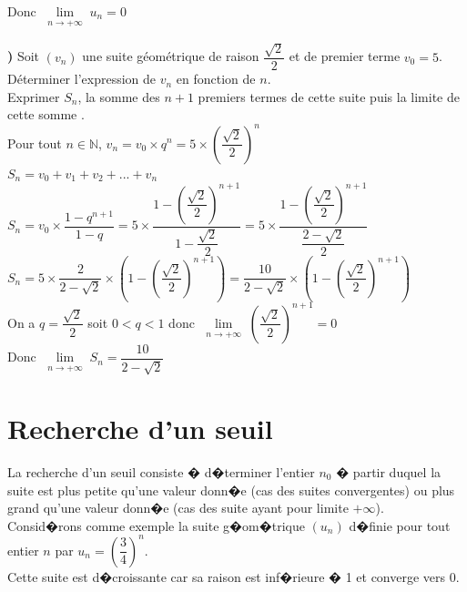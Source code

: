 \documentclass[a4paper,12pt,twoside,french]{extarticle}
\newcommand{\N}{\ensuremath{\mathbb{N}}\xspace}
\newcommand{\limite}[2]{\ensuremath{\displaystyle \lim\limits_{\substack{#1 \to #2}}}\xspace}
\newcounter{enumtabi}
\newcommand{\q}{\textbf{\stepcounter{enumtabi} \theenumtabi) } }
\begin{document}
Donc $\limite{n}{+\infty}u_n=0$\\
 
 \color{black}  
  
  \q Soit $(v_n)$ une suite géométrique de raison $\dfrac{\sqrt{2}}{2}$ et de premier terme $v_0=5$.\\
   Déterminer l'expression de $v_n$ en fonction de $n$.\\
    Exprimer $S_n$, la somme des $n+1$ premiers termes de cette suite puis la limite de cette somme .\\
  
  
   \color{blue}
Pour tout $n \in \N$, \hspace*{0.5cm} $v_n=v_0 \times q^n=5\times \left( \dfrac{\sqrt{2}}{2} \right)^n$\\

$S_n=v_0+v_1+v_2+...+v_n$\\
	
$S_n=v_0\times \dfrac{1-q^{n+1}}{1-q}=5 \times \dfrac{1- \left( \dfrac{\sqrt{2}}{2} \right)^{n+1}}{1-\dfrac{\sqrt{2}}{2}}= 5 \times \dfrac{1- \left( \dfrac{\sqrt{2}}{2} \right)^{n+1}}{\dfrac{2-\sqrt{2}}{2}}$\\

$S_n=5 \times \dfrac{2}{2-\sqrt{2}} \times \left(1- \left( \dfrac{\sqrt{2}}{2} \right)^{n+1} \right)=\dfrac{10}{2-\sqrt{2}} \times \left(1- \left( \dfrac{\sqrt{2}}{2} \right)^{n+1} \right) $\\



On a  $q=\dfrac{\sqrt{2}}{2}$ soit $0<q<1$ donc  $\limite{n}{+\infty}\left(\dfrac{\sqrt{2}}{2}\right)^{n+1}=0$\\

Donc $\limite{n}{+\infty}S_n=\dfrac{10}{2-\sqrt{2}}$\\
 
 \color{black}  
  
\newpage
\section{Recherche d'un seuil}

\noindent La recherche d'un seuil consiste � d�terminer l'entier $n_0$ � partir duquel la suite est plus petite qu'une valeur donn�e (cas des suites convergentes) ou plus grand qu'une valeur donn�e (cas des suite ayant pour limite $+\infty$).\\

\noindent Consid�rons comme exemple la suite g�om�trique $(u_n)$ d�finie pour tout entier $n$ par $u_n=\left(\dfrac{3}{4}\right)^n$.\\
Cette suite est d�croissante car sa raison est inf�rieure � 1 et converge vers 0.\\
\end{document}
